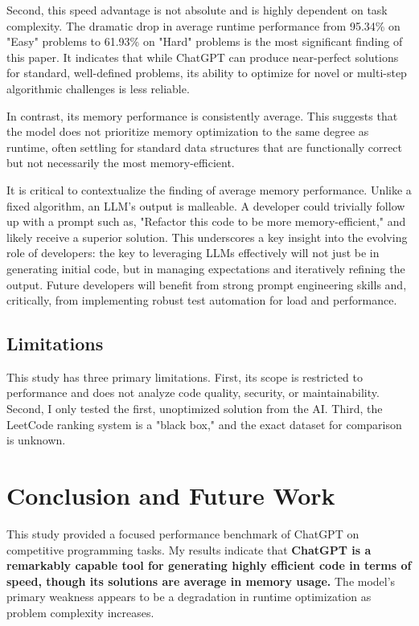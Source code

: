 \documentclass[12pt, a4paper]{article}
\begin{document}
Second, this speed advantage is not absolute and is highly dependent on task complexity. The dramatic drop in average runtime performance from 95.34\% on "Easy" problems to 61.93\% on "Hard" problems is the most significant finding of this paper. It indicates that while ChatGPT can produce near-perfect solutions for standard, well-defined problems, its ability to optimize for novel or multi-step algorithmic challenges is less reliable.

In contrast, its memory performance is consistently average. This suggests that the model does not prioritize memory optimization to the same degree as runtime, often settling for standard data structures that are functionally correct but not necessarily the most memory-efficient.

It is critical to contextualize the finding of average memory performance. Unlike a fixed algorithm, an LLM's output is malleable. A developer could trivially follow up with a prompt such as, "Refactor this code to be more memory-efficient," and likely receive a superior solution. This underscores a key insight into the evolving role of developers: the key to leveraging LLMs effectively will not just be in generating initial code, but in managing expectations and iteratively refining the output. Future developers will benefit from strong prompt engineering skills and, critically, from implementing robust test automation for load and performance.

\subsection{Limitations}
This study has three primary limitations. First, its scope is restricted to performance and does not analyze code quality, security, or maintainability. Second, I only tested the first, unoptimized solution from the AI. Third, the LeetCode ranking system is a "black box," and the exact dataset for comparison is unknown.

\section{Conclusion and Future Work}

This study provided a focused performance benchmark of ChatGPT on competitive programming tasks. My results indicate that \textbf{ChatGPT is a remarkably capable tool for generating highly efficient code in terms of speed, though its solutions are average in memory usage.} The model's primary weakness appears to be a degradation in runtime optimization as problem complexity increases.
\end{document}
